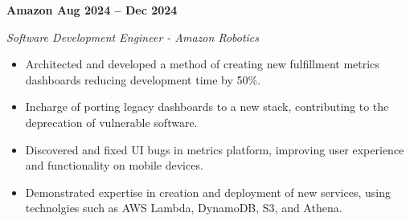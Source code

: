 \vspace{0.1cm}
\textbf{Amazon \hfill Aug 2024 -- Dec 2024} \par
\textit{Software Development Engineer - Amazon Robotics} \par
\begin{itemize}
	\item Architected and developed a method of creating new fulfillment metrics dashboards reducing development time by 50\%.
    \item Incharge of porting legacy dashboards to a new stack, contributing to the deprecation of vulnerable software.
    \item Discovered and fixed UI bugs in metrics platform, improving user experience and functionality on mobile devices.
    \item Demonstrated expertise in creation and deployment of new services, using technolgies such as AWS Lambda, DynamoDB, S3, and Athena.
\end{itemize} \par